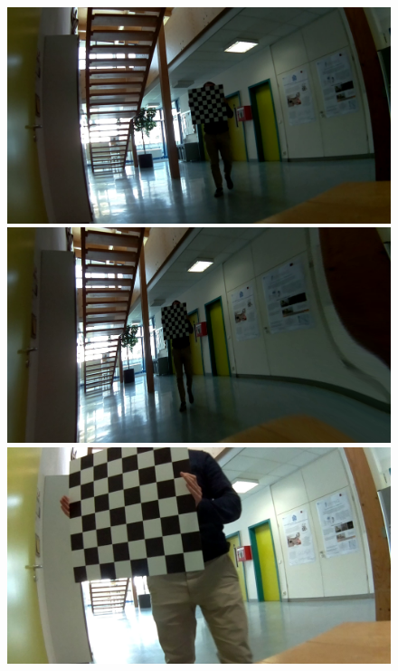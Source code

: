 \begin{figure}[H]
     \begin{minipage}[t]{0.24\textwidth}
        \centering
        \includegraphics[width=.95\textwidth]{image/3/rec_2/622_og.png}
     \end{minipage}%
     \begin{minipage}[t]{0.24\textwidth}
        \centering
        \includegraphics[width=.95\textwidth]{image/3/rec_2/622_undist.png}
     \end{minipage}
     \begin{minipage}[t]{0.24\textwidth}
        \centering
        \includegraphics[width=.95\textwidth]{image/3/rec_2/737_og.png}

\end{minipage}
\end{figure}
